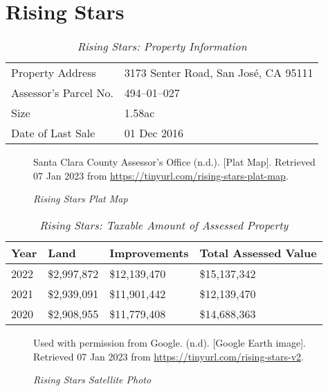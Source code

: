 
\clearpage
\section{Rising Stars}\label{sec:rising-stars-info}\indent

\begin{table}[htbp]
  \SingleSpacing%
  \caption[Rising Stars: Property Information]{\textit{Rising Stars: Property Information}}%
  \label{tab:rising-stars-prop-info}
  \begin{tabular}{ll}
    \toprule
    Property Address      & 3173 Senter Road, San José, CA 95111 \\
    Assessor's Parcel No. & 494–01–027 \\
    Size                  & 1.58ac \\
    Date of Last Sale     & 01 Dec 2016 \\
    \bottomrule
  \end{tabular}
\end{table}

\begin{figure}[hbtp]
  \caption[Rising Stars Plat Map]{\textit{Rising Stars Plat Map}}%
  \label{fig:rising-stars-plat-map}
  {Santa Clara County Assessor's Office (n.d.). [Plat Map]. Retrieved 07 Jan 2023 from  \url{https://tinyurl.com/rising-stars-plat-map}.}
\end{figure}

\begin{table}[hbtp]
  \SingleSpacing%
  \caption[Rising Stars: Taxable Amount of Assessed Propery]{\textit{Rising Stars: Taxable Amount of Assessed Property}}%
  \label{tab:rising-stars-taxable-amount}
  \begin{tabular}{llll}
    \toprule
    Year & Land        & Improvements & Total Assessed Value \\
    \midrule
    2022 & \$2,997,872 & \$12,139,470 & \$15,137,342 \\
    2021 & \$2,939,091 & \$11,901,442 & \$12,139,470 \\
    2020 & \$2,908,955 & \$11,779,408 & \$14,688,363 \\
    \bottomrule
  \end{tabular}
\end{table}

\begin{figure}[hbtp]
  \caption[Rising Stars Satellite Photo]{\textit{Rising Stars Satellite Photo}}%
  \label{fig:rising-stars-sat-photo}
  {Used with permission from Google. (n.d). [Google Earth image]. Retrieved 07 Jan 2023 from \url{https://tinyurl.com/rising-stars-v2}.}
\end{figure}


